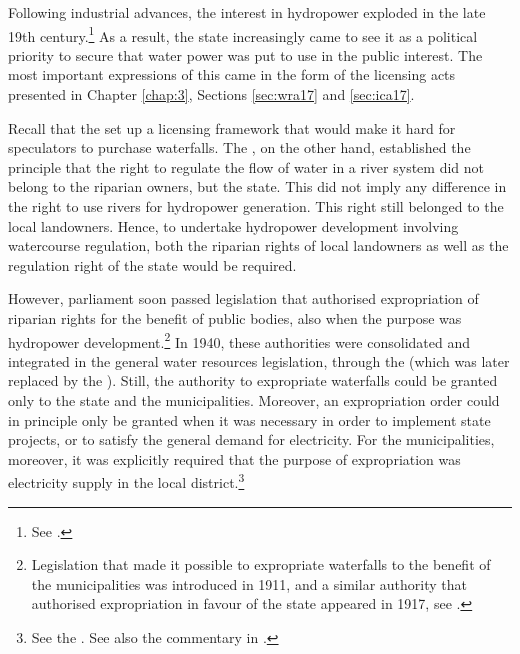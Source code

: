 Following industrial advances, the interest in hydropower exploded in the late 19th century.\footnote{See \cite[58-59]{falkanger87}.} As a result, the state increasingly came to see it as a political priority to secure that water power was put to use in the public interest. The most important expressions of this came in the form of the licensing acts presented in Chapter \ref{chap:3}, Sections \ref{sec:wra17} and \ref{sec:ica17}. 

Recall that the \cite{ica17} set up a licensing framework that would make it hard for speculators to purchase waterfalls. The \cite{wra17}, on the other hand, established the principle that the right to regulate the flow of water in a river system did not belong to the riparian owners, but the state. This did not imply any difference in the right to use rivers for hydropower generation. This right still belonged to the local landowners. Hence, to undertake hydropower development involving watercourse regulation, both the riparian rights of local landowners as well as the regulation right of the state would be required.

However, parliament soon passed legislation that authorised expropriation of riparian rights for the benefit of public bodies, also when the purpose was hydropower development.\footnote{Legislation that made it possible to expropriate waterfalls to the benefit of the municipalities was introduced in 1911, and a similar authority that authorised expropriation in favour of the state appeared in 1917, see \cite[29]{amundsen28}.} In 1940, these authorities were consolidated and integrated in the general water resources legislation, through the \cite{wra40} (which was later replaced by the \cite{wra00}). Still, the authority to expropriate waterfalls could be granted only to the state and the municipalities. Moreover, an expropriation order could in principle only be granted when it was necessary in order to implement state projects, or to satisfy the general demand for electricity. For the municipalities, moreover, it was explicitly required that the purpose of expropriation was electricity supply in the local district.\footnote{See the \cite[148]{wra40}. See also the commentary in \cite[201-210]{sorensen41}.}

